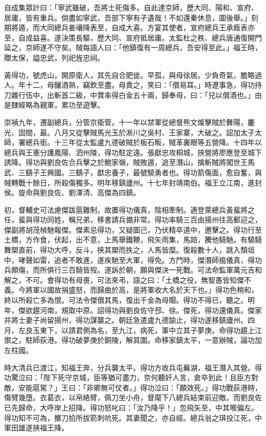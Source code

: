 \begin{pinyinscope}
自成集眾計曰：「寧武雖破，吾將士死傷多。自此達京師，歷大同、陽和、宣府、居庸，皆有重兵。倘盡如寧武，吾部下寧有孑遺哉！不如還秦休息，圖後舉。」刻期將遁，而大同總兵姜瓖降表至，自成大喜。方宴其使者，宣府總兵王承廕表亦至，自成益喜。遂決策長驅，歷大同、宣府抵居庸。太監杜之秩、總兵唐通復開門延之，京師遂不守矣。賊每語人曰：「他鎮復有一周總兵，吾安得至此。」福王時，贈太保，謚忠武，列祀旌忠祠。

黃得功，號虎山，開原衛人，其先自合肥徙。早孤，與母徐居。少負奇氣，膽略過人。年十二，母釀酒熟，竊飲至盡。母責之，笑曰：「償易耳。」時遼事急，得功持刀雜行伍中，出斬首二級，中賞率得白金五十兩，歸奉母，曰：「兒以償酒也。」由是隸經略為親軍，累功至遊擊。

崇禎九年，遷副總兵，分管京衛管。十一年以禁軍從總督熊文燦擊賊於舞陽，鏖光、固間，最。八月又從擊賊馬光玉於淅川之吳村、王家寨，大破之。詔加太子太師，署總兵銜。十三年從太監盧九德破賊於板石畈，賊革裏眼等五營降。十四年以總兵與王憲分護鳳陽、泗州陵，得功駐定遠。張獻忠攻桐城，挾營將廖應登至城下誘降。得功與劉良佐合兵擊之於鮑家嶺，賊敗遁，追至潛山，擒斬賊將闖世王馬武、三鷂子王興國。三鷂子，獻忠養子，最號驍勇者也。得功箭傷面，愈自奮，與賊轉戰十餘日，所殺傷獨多。明年移鎮廬州。十七年封靖南伯。福王立江南，進封侯。旋命與劉良佐、劉澤清、高傑為四鎮。

初，督輔史可法慮傑跋扈難制，故置得功儀真，陰相牽制。適登萊總兵黃蜚將之任，蜚與得功同姓，稱兄弟，移書請兵備非常。得功率騎三百由揚州往高郵迎之，傑副將胡茂楨馳報傑。傑素忌得功，又疑圖己，乃伏精卒道中，邀擊之。得功行至土橋，方作食，伏起，出不意，上馬舉鐵鞭，飛矢雨集，馬踣，騰他騎馳。有驍騎舞槊直前，得功大呼，反斗，挾其槊而抶之，人馬皆糜。復殺數十人，跳入頹垣中，哮聲如雷，追者不敢進，遂疾馳至大軍，得免。方鬥時，傑潛師搗儀真，得功兵頗傷，而所俱行三百騎皆歿。遂訴於朝，願與傑決一死戰。可法命監軍萬元吉和解之，不可。會得功有母喪，可法來弔，語之曰：「土橋之役，無智愚皆知傑不義。今將軍以國故捐盛怒，而歸曲於高，是將軍收大名於天下也。」得功色稍和，終以所殺亡多為恨。可法令傑償其馬，復出千金為母賵。得功不得已，聽之。明年，傑欲趨河南，規取中原。詔得功與劉良佐守邳、徐。傑死，得功還儀真。傑家并將士妻子尚留揚州，得功謀襲之。朝廷急遣盧九德諭止，得功遂移鎮廬州。四月，左良玉東下，以請君側為名，至九江，病死，軍中立其子夢庚。命得功趨上江禦之，駐師荻港。得功破夢庚於銅陵，解其圍。命移家鎮太平，一意辦賊，論功加左柱國。

時大清兵已渡江，知福王奔，分兵襲太平。得功方收兵屯蕪湖，福王潛入其營。得功驚泣曰：「陛下死守京城，臣等猶可盡力，奈何聽奸人言，倉卒到此！且臣方對敵，安能扈駕？」王曰：「非卿無可仗者。」得功泣曰：「願效死。」得功戰荻港時，傷臂幾墮。衣葛衣，以帛絡臂，佩刀坐小舟，督麾下八總兵結束前迎敵。而劉良佐已先歸命，大呼岸上招降。得功怒叱曰：「汝乃降乎！」忽飛矢至，中其喉偏左。得功知不可為，擲刀拾所拔箭刺吭死。其妻聞之，亦自經。總兵翁之琪投江死，中軍田雄遂挾福王降。


\end{pinyinscope}
